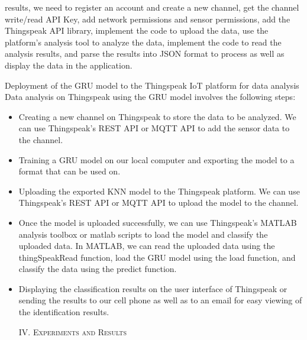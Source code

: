 results, we need to register an account and create a
new channel, get the channel write/read API Key, add
network permissions and sensor permissions, add the
Thingspeak API library, implement the code to upload
the data, use the platform’s analysis tool to analyze the
data, implement the code to read the analysis results, and
parse the results into JSON format to process as well as
display the data in the application.
\par
Deployment of the GRU model to the Thingspeak IoT
platform for data analysis Data analysis on Thingspeak
using the GRU model involves the following steps:
\begin{itemize}

\renewcommand{\labelitemi}{1)}
\item Creating a new channel on Thingspeak to store
the data to be analyzed. We can use Thingspeak’s
REST API or MQTT API to add the sensor data
to the channel.
\renewcommand{\labelitemi}{2)}
\item   Training a GRU model on our local computer and
exporting the model to a format that can be used
on.
    \renewcommand{\labelitemi}{3)}
        \item Uploading the exported KNN model to the Thingspeak platform. We can use Thingspeak’s REST
API or MQTT API to upload the model to the
channel.
    \renewcommand{\labelitemi}{4)}
        \item Once the model is uploaded successfully, we can
use Thingspeak’s MATLAB analysis toolbox or
matlab scripts to load the model and classify the
uploaded data. In MATLAB, we can read the
uploaded data using the thingSpeakRead function,
load the GRU model using the load function, and
classify the data using the predict function.
    \renewcommand{\labelitemi}{5)}
        \item  Displaying the classification results on the user
interface of Thingspeak or sending the results to
our cell phone as well as to an email for easy
viewing of the identification results.

 \begin{center}
        \textsc{IV. Experiments and Results}\\
    \end{center}
\end{itemize}

